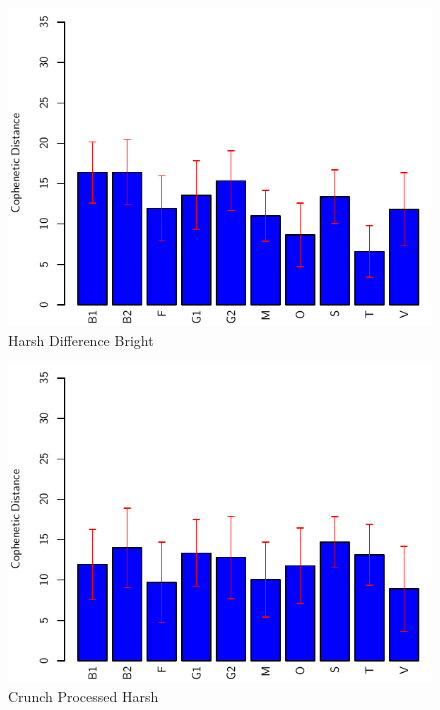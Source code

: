 		\begin{figure}[h!]
			\centering
			\includegraphics{chapter7/Images/HarshDifferenceBrightBar.pdf}
			\caption{Harsh Difference Bright}
		\end{figure}

		\begin{figure}[h!]
			\centering
			\includegraphics{chapter7/Images/HarshDifferenceHarshBar.pdf}
			\caption{Crunch Processed Harsh}
		\end{figure}

